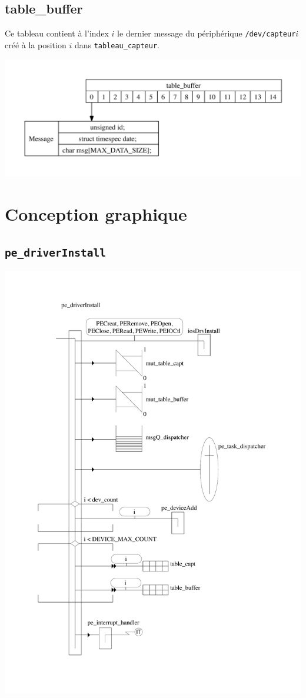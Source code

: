 \documentclass[11pt, a4paper]{article}
\newcommand{\kw}[1]{\texttt{#1}}
\begin{document}
\subsection{table\_buffer}
Ce tableau contient à l'index $i$ le dernier message du périphérique \kw{/dev/capteur}$i$ créé à la position $i$ dans \kw{tableau\_capteur}.

\includegraphics[width=\textwidth]{ressources/table_buffer.pdf}\\

\section{Conception graphique}

\subsection{\kw{pe\_driverInstall}}
\includegraphics[width=\textwidth]{ressources/pe_driverInstall.pdf}
\end{document}
